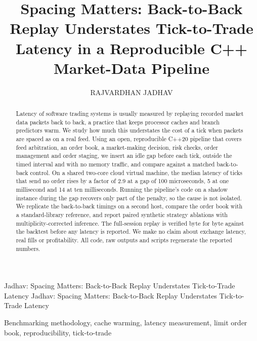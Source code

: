 \documentclass{ieeeaccess}
\begin{document}

\title{Spacing Matters: Back-to-Back Replay Understates Tick-to-Trade Latency in a Reproducible C++ Market-Data Pipeline}
\author{\uppercase{Rajvardhan Jadhav}}
\address[1]{Fox School of Business, Temple University, Philadelphia, PA, USA (e-mail: rajvardhanjadhav124@gmail.com)}

\markboth
{Jadhav: Spacing Matters: Back-to-Back Replay Understates Tick-to-Trade Latency}
{Jadhav: Spacing Matters: Back-to-Back Replay Understates Tick-to-Trade Latency}


\begin{abstract}
Latency of software trading systems is usually measured by replaying recorded market data packets back to back, a practice that keeps processor caches and branch predictors warm. We study how much this understates the cost of a tick when packets are spaced as on a real feed. Using an open, reproducible C++20 pipeline that covers feed arbitration, an order book, a market-making decision, risk checks, order management and order staging, we insert an idle gap before each tick, outside the timed interval and with no memory traffic, and compare against a matched back-to-back control. On a shared two-core cloud virtual machine, the median latency of ticks that send no order rises by a factor of 2.9 at a gap of 100 microseconds, 5 at one millisecond and 14 at ten milliseconds. Running the pipeline's code on a shadow instance during the gap recovers only part of the penalty, so the cause is not isolated. We replicate the back-to-back timings on a second host, compare the order book with a standard-library reference, and report paired synthetic strategy ablations with multiplicity-corrected inference. The full-session replay is verified byte for byte against the backtest before any latency is reported. We make no claim about exchange latency, real fills or profitability. All code, raw outputs and scripts regenerate the reported numbers.
\end{abstract}

\begin{keywords}
Benchmarking methodology, cache warming, latency measurement, limit order book, reproducibility, tick-to-trade
\end{keywords}
\end{document}
